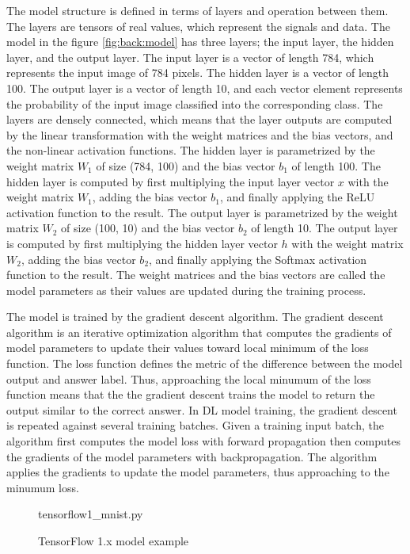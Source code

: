 The model structure is defined in terms of layers and operation between them.
The layers are tensors of real values, which represent the signals and data.
The model in the figure \ref{fig:back:model} has three layers;
the input layer, the hidden layer, and the output layer.
The input layer is a vector of length 784, which represents the input image
of 784 pixels.
The hidden layer is a vector of length 100.
The output layer is a vector of length 10, and each vector element represents 
the probability of the input image classified into the corresponding class.
The layers are densely connected, which means that
the layer outputs are computed by the linear transformation with 
the weight matrices and the bias vectors, 
and the non-linear activation functions. 
The hidden layer is parametrized by the weight matrix
$W_1$ of size (784, 100) and the bias vector $b_1$ of length 100.
The hidden layer is computed by first multiplying the input layer vector $x$
with the weight matrix $W_1$, adding the bias vector $b_1$, and finally applying
the ReLU activation function to the result.
The output layer is parametrized by the weight matrix $W_2$ of size (100, 10)
and the bias vector $b_2$ of length 10.
The output layer is computed by first multiplying the hidden layer vector $h$
with the weight matrix $W_2$, adding the bias vector $b_2$, and finally applying
the Softmax activation function to the result.
The weight matrices and the bias vectors are called the model parameters 
as their values are updated during the training process.

The model is trained by the gradient descent algorithm. 
The gradient descent algorithm is an iterative optimization algorithm
that computes the gradients of model parameters to update their values toward
local minimum of the loss function.
The loss function defines the metric of the difference between the model 
output and answer label.
Thus, approaching the local minumum of the loss function means that the
the gradient descent trains the model to return the output similar to the
correct answer.
In DL model training, the gradient descent is repeated against several
training batches. Given a training input batch, the algorithm first computes
the model loss with forward propagation then computes the gradients of the
model parameters with backpropagation. The algorithm applies the gradients
to update the model parameters, thus approaching to the minumum loss.

\begin{figure}[ht!]

{tensorflow1_mnist.py}
  \caption{TensorFlow 1.x model example}
\label{fig:back:tf1}
\end{figure}

